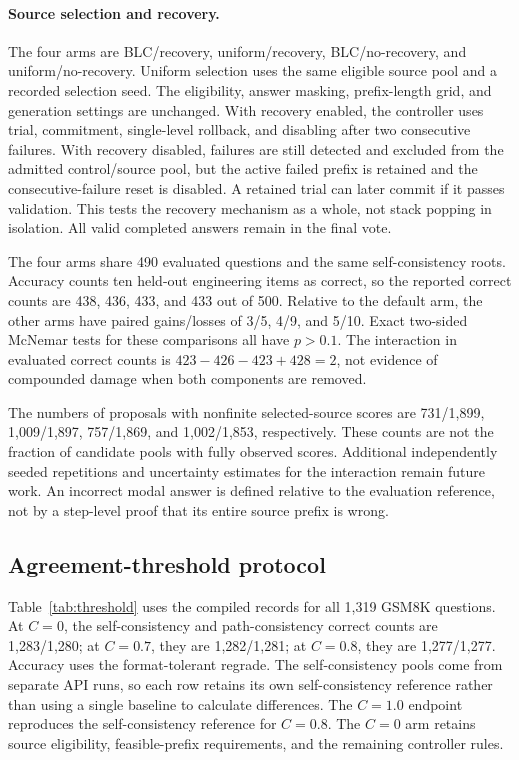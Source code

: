 \paragraph{Source selection and recovery.}
The four arms are BLC/recovery, uniform/recovery, BLC/no-recovery, and uniform/no-recovery. Uniform selection uses the same eligible source pool and a recorded selection seed. The eligibility, answer masking, prefix-length grid, and generation settings are unchanged. With recovery enabled, the controller uses trial, commitment, single-level rollback, and disabling after two consecutive failures. With recovery disabled, failures are still detected and excluded from the admitted control/source pool, but the active failed prefix is retained and the consecutive-failure reset is disabled. A retained trial can later commit if it passes validation. This tests the recovery mechanism as a whole, not stack popping in isolation. All valid completed answers remain in the final vote.

The four arms share 490 evaluated questions and the same self-consistency roots. Accuracy counts ten held-out engineering items as correct, so the reported correct counts are 438, 436, 433, and 433 out of 500. Relative to the default arm, the other arms have paired gains/losses of 3/5, 4/9, and 5/10. Exact two-sided McNemar tests for these comparisons all have $p>0.1$. The interaction in evaluated correct counts is $423-426-423+428=2$, not evidence of compounded damage when both components are removed.

The numbers of proposals with nonfinite selected-source scores are 731/1,899, 1,009/1,897, 757/1,869, and 1,002/1,853, respectively. These counts are not the fraction of candidate pools with fully observed scores. Additional independently seeded repetitions and uncertainty estimates for the interaction remain future work. An incorrect modal answer is defined relative to the evaluation reference, not by a step-level proof that its entire source prefix is wrong.

\subsection{Agreement-threshold protocol}
\label{app:threshold}
Table~\ref{tab:threshold} uses the compiled records for all 1,319 GSM8K questions. At $C=0$, the self-consistency and path-consistency correct counts are 1,283/1,280; at $C=0.7$, they are 1,282/1,281; at $C=0.8$, they are 1,277/1,277. Accuracy uses the format-tolerant regrade. The self-consistency pools come from separate API runs, so each row retains its own self-consistency reference rather than using a single baseline to calculate differences. The $C=1.0$ endpoint reproduces the self-consistency reference for $C=0.8$. The $C=0$ arm retains source eligibility, feasible-prefix requirements, and the remaining controller rules.

